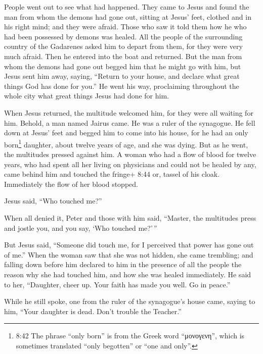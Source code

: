  People went out to see what had happened. They came to
Jesus and found the man from whom the demons had gone out, sitting at
Jesus' feet, clothed and in his right mind; and they were afraid.
 Those who saw it told them how he who had been possessed
by demons was healed.  All the people of the surrounding
country of the Gadarenes asked him to depart from them, for they were
very much afraid. Then he entered into the boat and returned.
 But the man from whom the demons had gone out begged him
that he might go with him, but Jesus sent him away, saying,
 ``Return to your house, and declare what great things God
has done for you.'' He went his way, proclaiming throughout the whole
city what great things Jesus had done for him.

 When Jesus returned, the multitude welcomed him, for they
were all waiting for him.  Behold, a man named Jairus came.
He was a ruler of the synagogue. He fell down at Jesus' feet and begged
him to come into his house,  for he had an only
born\footnote{8:42 The phrase ``only born'' is from the Greek word
  ``μονογενη'', which is sometimes translated ``only begotten'' or ``one
  and only''.} daughter, about twelve years of age, and she was dying.
But as he went, the multitudes pressed against him.  A
woman who had a flow of blood for twelve years, who had spent all her
living on physicians and could not be healed by any,  came
behind him and touched the fringe+ 8:44 or, tassel of his cloak.
Immediately the flow of her blood stopped.

 Jesus said, ``Who touched me?''

When all denied it, Peter and those with him said, ``Master, the
multitudes press and jostle you, and you say, `Who touched me?'\,''

 But Jesus said, ``Someone did touch me, for I perceived
that power has gone out of me.''  When the woman saw that
she was not hidden, she came trembling; and falling down before him
declared to him in the presence of all the people the reason why she had
touched him, and how she was healed immediately.  He said
to her, ``Daughter, cheer up. Your faith has made you well. Go in
peace.''

 While he still spoke, one from the ruler of the
synagogue's house came, saying to him, ``Your daughter is dead. Don't
trouble the Teacher.''


